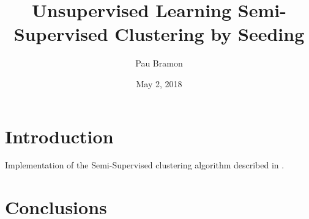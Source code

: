 \documentclass[11pt]{article}
\begin{document}
	
\title{Unsupervised Learning \linebreak Semi-Supervised Clustering by Seeding}
\date{May 2, 2018}
\author{Pau Bramon}
\maketitle

\tableofcontents

\newpage

\section{Introduction}\label{sec:Introduction}

Implementation of the Semi-Supervised clustering algorithm described in \cite{Basu02semi-supervisedclustering}.




\section{Conclusions}\label{sec:Conclusions}


\newpage

\end{document}
